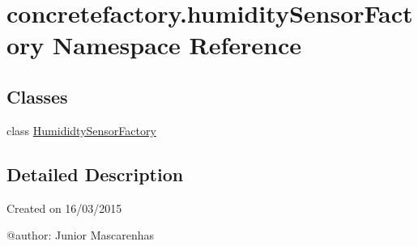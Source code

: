 \hypertarget{namespaceconcretefactory_1_1humiditySensorFactory}{}\section{concretefactory.\+humidity\+Sensor\+Factory Namespace Reference}
\label{namespaceconcretefactory_1_1humiditySensorFactory}
\subsection*{Classes}
\begin{DoxyCompactItemize}
\item 
class \hyperlink{classconcretefactory_1_1humiditySensorFactory_1_1HumididtySensorFactory}{Humididty\+Sensor\+Factory}
\end{DoxyCompactItemize}


\subsection{Detailed Description}
\begin{DoxyVerb}Created on 16/03/2015

@author: Junior Mascarenhas
\end{DoxyVerb}
 